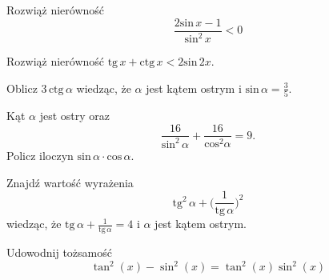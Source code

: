 \zadanie Rozwiąż nierówność \[ \dfrac{2\text{sin}\, x - 1}{\text{sin}^2\, x} < 0 \]

\zadanie Rozwiąż nierówność $ \text{tg}\,x + \text{ctg}\,x < 2\text{sin}\,2x$.

\zadanie Oblicz $ 3\,\text{ctg}\,\alpha $ wiedząc, że $\alpha$ jest kątem ostrym i $\text{sin}\,\alpha = \frac{3}{5} $.

\zadanie Kąt $\alpha$ jest ostry oraz \[ \dfrac{16}{\text{sin}^2\, \alpha} + \dfrac{16}{\text{cos}^2 \alpha} = 9. \] Policz iloczyn $\text{sin}\, \alpha\cdot\text{cos}\, \alpha$.

\zadanie Znajdź wartość wyrażenia \[\text{tg}^2\,\alpha + \bigg(\frac{1}{\text{tg}\,\alpha}\bigg)^2 \] wiedząc, że $\text{tg}\,\alpha + \frac{1}{\text{tg}\,\alpha} = 4$ i $\alpha$ jest kątem ostrym.

\zadanie Udowodnij tożsamość \[ \tan^2(x) - \sin^2(x) = \tan^2(x)\sin^2(x) \]